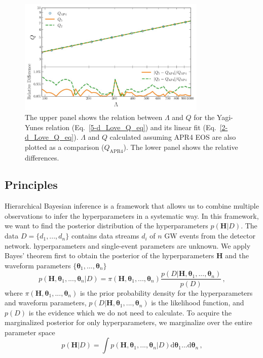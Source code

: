 \documentclass[a4paper,11pt]{article}
\begin{document}
\begin{figure}[tbp]
\centering
\includegraphics[width=0.8\textwidth]{2d-5d difference.pdf}%
\caption{\label{relative_difference} The upper panel shows the relation between $\Lambda$ and $Q$ for the Yagi-Yunes relation (Eq.~\eqref{5-d_Love_Q_eq}) and its linear fit (Eq.~\eqref{2-d_Love_Q_eq}). $\Lambda$ and $Q$ calculated assuming APR4 EOS are also plotted as a comparison ($Q_{\mathrm{APR4}}$). The lower panel shows the relative differences.}
\end{figure}

\subsection{Principles}
\label{subsec:framework_principles}

Hierarchical Bayesian inference is a framework that allows us to combine multiple observations to infer the hyperparameters in a systematic way. In this framework, we want to find the posterior distribution of the hyperparameters $p(\bm{H}|D)$. The data $D=\{d_1,...,d_n\}$ contains data streams $d_i$ of $n$ GW events from the detector network. hyperparameters and single-event parameters are unknown. We apply Bayes' theorem first to obtain the posterior of the hyperparameters $\bm{H}$ and the waveform parameters $\{\bm{\theta}_1,...,\bm{\theta}_n\}$
\begin{equation}
\label{bayes2}
p(\bm{H},\bm{\theta}_1,...,\bm{\theta}_n|D)=\pi(\bm{H},\bm{\theta}_1,...,\bm{\theta}_n)\frac{p(D|\bm{H},\bm{\theta}_1,...,\bm{\theta}_n)}{p(D)}\,,
\end{equation}
where $\pi(\bm{H},\bm{\theta}_1,...,\bm{\theta}_n)$ is the prior probability density for the hyperparameters and waveform parameters, $p(D|\bm{H},\bm{\theta}_1,...,\bm{\theta}_n)$ is the likelihood function, and $p(D)$ is the evidence which we do not need to calculate. To acquire the marginalized posterior for only hyperparameters, we marginalize over the entire parameter space
\begin{equation}
\label{bayes1}
p(\bm{H}|D) = \int p(\bm{H},\bm{\theta}_1,...,\bm{\theta}_n|D) \text{d}\bm{\theta}_1...\text{d}\bm{\theta}_n\,,
\end{equation}
\end{document}
